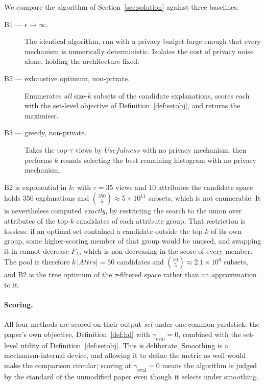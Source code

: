 We compare the algorithm of Section~\ref{sec:solution} against three baselines.

\begin{description}
  \item[B1 --- $\epsilon\rightarrow\infty$.] The identical algorithm, run with a privacy budget large enough that every mechanism is numerically deterministic. Isolates the cost of privacy noise alone, holding the architecture fixed.
  \item[B2 --- exhaustive optimum, non-private.] Enumerates \emph{all} size-$k$ subsets of the candidate explanations, scores each with the set-level objective of Definition~\ref{def:setobj}, and returns the maximiser.
  \item[B3 --- greedy, non-private.] Takes the top-$\tau$ views by $Usefulness$ with no privacy mechanism, then performs $k$ rounds selecting the best remaining histogram with no privacy mechanism.
\end{description}

B2 is exponential in $k$: with $\tau=35$ views and $10$ attributes the candidate space holds $350$ explanations and $\binom{350}{5}\approx5\times10^{11}$ subsets, which is not enumerable.
It is nevertheless computed \emph{exactly}, by restricting the search to the union over attributes of the top-$k$ candidates of each attribute group.
That restriction is lossless: if an optimal set contained a candidate outside the top-$k$ of its own group, some higher-scoring member of that group would be unused, and swapping it in cannot decrease $F_\lambda$, which is non-decreasing in the score of every member.
The pool is therefore $k\,|Attrs|=50$ candidates and $\binom{50}{5}\approx2.1\times10^{6}$ subsets, and B2 is the true optimum of the $\tau$-filtered space rather than an approximation to it.

\paragraph{Scoring.}
All four methods are scored on their output \emph{set} under one common yardstick: the paper's own objective, Definition~\ref{def:hd} with $\gamma_{\text{eval}}=0$, combined with the set-level utility of Definition~\ref{def:setobj}.
This is deliberate. Smoothing is a mechanism-internal device, and allowing it to define the metric as well would make the comparison circular; scoring at $\gamma_{\text{eval}}=0$ means the algorithm is judged by the standard of the unmodified paper even though it selects under smoothing.

